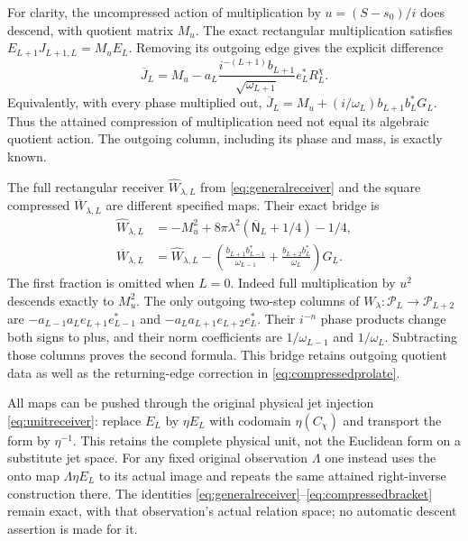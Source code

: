 \documentclass[11pt]{article}
\newcommand{\PP}{\mathcal P}\newcommand{\HH}{\mathcal H}
\begin{document}
For clarity, the uncompressed action of multiplication
by $u=(S-s_0)/i$ does descend, with quotient matrix $M_u$.
The exact rectangular multiplication satisfies
$E_{L+1}J_{L+1,L}=M_uE_L$. Removing its outgoing
edge gives the explicit difference
\begin{equation}\label{eq:Jquotient}
 \overline J_L=M_u-a_L
       \frac{i^{-(L+1)}b_{L+1}}{\sqrt{\omega_{L+1}}}
                                  e_L^*R_L^\chi.
\end{equation}
Equivalently, with every phase multiplied out,
$\overline J_L=M_u+(i/\omega_L)b_{L+1}b_L^*G_L$.
Thus the attained compression of multiplication need
not equal its algebraic quotient action. The outgoing
column, including its phase and mass, is exactly known.

The full rectangular receiver $\widehat W_{\lambda,L}$
from \eqref{eq:generalreceiver} and the square compressed
$\overline W_{\lambda,L}$ are different specified maps.
Their exact bridge is
\begin{equation}\label{eq:fullcompbridge}
 \begin{aligned}
 \widehat W_{\lambda,L}
   &=-M_u^2+8\pi\lambda^2(\overline{\mathsf N}_L+1/4)-1/4,\\
 \overline W_{\lambda,L}
   &=\widehat W_{\lambda,L}
     -\left(\frac{b_{L+1}b_{L-1}^*}{\omega_{L-1}}
             +\frac{b_{L+2}b_L^*}{\omega_L}\right)G_L .
 \end{aligned}
\end{equation}
The first fraction is omitted when $L=0$.
Indeed full multiplication by $u^2$ descends exactly to
$M_u^2$. The only outgoing two-step columns of
$W_\lambda:\PP_L\to\PP_{L+2}$ are
$-a_{L-1}a_Le_{L+1}e_{L-1}^*$
and $-a_La_{L+1}e_{L+2}e_L^*$.
Their $i^{-n}$ phase products change both signs to plus,
and their norm coefficients are $1/\omega_{L-1}$ and
$1/\omega_L$. Subtracting those columns proves the
second formula. This bridge retains outgoing quotient
data as well as the returning-edge correction in
\eqref{eq:compressedprolate}.

All maps can be pushed through the original physical
jet injection \eqref{eq:unitreceiver}: replace $E_L$
by $\eta E_L$ with codomain $\eta(C_\chi)$ and transport
the form by $\eta^{-1}$. This retains the complete
physical unit, not the Euclidean form on a substitute
jet space. For any fixed original observation $\Lambda$
one instead uses the onto map $\Lambda\eta E_L$
to its actual image and repeats the same attained
right-inverse construction there. The identities
\eqref{eq:generalreceiver}--\eqref{eq:compressedbracket}
remain exact, with that observation's actual relation
space; no automatic descent assertion is made for it.
\end{document}
